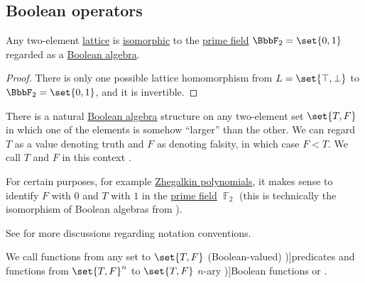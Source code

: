 \subsection{Boolean operators}\label{subsec:boolean_operators}

\begin{proposition}\label{thm:two_element_lattice}
  Any two-element \hyperref[def:semilattice/lattice]{lattice} is \hyperref[def:semilattice/homomorphism]{isomorphic} to the \hyperref[thm:finite_fields]{prime field} \( \BbbF_2 = \set{ 0, 1 } \) regarded as a \hyperref[def:boolean_algebra]{Boolean algebra}.
\end{proposition}
\begin{proof}
  There is only one possible lattice homomorphism from \( L = \set{ \top, \bot } \) to \( \BbbF_2 = \set{ 0, 1 } \), and it is invertible.
\end{proof}

\begin{definition}\label{def:boolean_value}\mimprovised
  There is a natural \hyperref[def:boolean_algebra]{Boolean algebra} structure on any two-element set \( \set{ T, F } \) in which one of the elements is somehow \enquote{larger} than the other. We can regard \( T \) as a value denoting truth and \( F \) as denoting falsity, in which case \( F < T \). We call \( T \) and \( F \) in this context .

  For certain purposes, for example \hyperref[def:zhegalkin_polynomial]{Zhegalkin polynomials}, it makes sense to identify \( F \) with \( 0 \) and \( T \) with \( 1 \) in the \hyperref[thm:finite_fields]{prime field} \( \BbbF_2 \) (this is technically the isomorphism of Boolean algebras from ).
\end{definition}
\begin{comments}
  \item See  for more discussions regarding notation conventions.
\end{comments}

\begin{definition}\label{def:boolean_operator}
  We call functions from any set to \( \set{ T, F } \) (Boolean-valued) \term[ru=предикаты, en=predicates (\cite[15]{Savage1998})]{predicates} and functions from \( \set{ T, F }^n \) to \( \set{ T, F } \) \( n \)-ary \term[ru=булевые функции, en=Boolean functions (\cite[12]{Savage1998})]{Boolean functions} or .
\end{definition}

